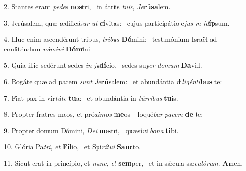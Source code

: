 2. Stantes erant \textit{pe}\textit{des} \textbf{nos}tri, \ast\  in átriis \textit{tu}\textit{is}, \textit{Je}\textbf{rú}\textbf{sa}lem.\

3. Jerúsalem, quæ ædificá\textit{tur} \textit{ut} \textbf{cí}vitas: \ast\  cujus participátio e\textit{jus} \textit{in} \textit{id}\textbf{íp}sum.\

4. Illuc enim ascendérunt tribus, \textit{tri}\textit{bus} \textbf{Dó}mini: \ast\  testimónium Israël ad confiténdum \textit{nó}\textit{mi}\textit{ni} \textbf{Dó}\textbf{mi}ni.\

5. Quia illic sedérunt sedes \textit{in} \textit{ju}\textbf{dí}cio, \ast\  sedes su\textit{per} \textit{do}\textit{mum} \textbf{Da}vid.\

6. Rogáte quæ ad pacem \textit{sunt} \textit{Je}\textbf{rú}salem: \ast\  et abundántia di\textit{li}\textit{gén}\textit{ti}\textbf{bus} te:\

7. Fiat pax in vir\textit{tú}\textit{te} \textbf{tu}a: \ast\  et abundántia in \textit{túr}\textit{ri}\textit{bus} \textbf{tu}is.\

8. Propter fratres meos, et pró\textit{xi}\textit{mos} \textbf{me}os, \ast\  loqué\textit{bar} \textit{pa}\textit{cem} \textbf{de} te:\

9. Propter domum Dómini, \textit{De}\textit{i} \textbf{nos}tri, \ast\  quæsí\textit{vi} \textit{bo}\textit{na} \textbf{ti}bi.\

10. Glória Pa\textit{tri}, \textit{et} \textbf{Fí}lio, \ast\  et Spi\textit{rí}\textit{tu}\textit{i} \textbf{Sanc}to.\

11. Sicut erat in princípio, et \textit{nunc}, \textit{et} \textbf{sem}per, \ast\  et in sǽcula sæ\textit{cu}\textit{ló}\textit{rum}. \textbf{A}men.\

